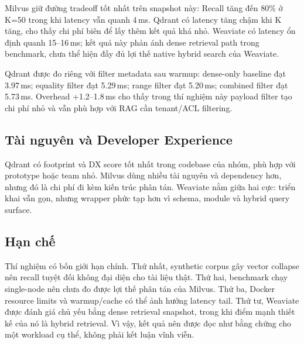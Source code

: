 Milvus giữ đường tradeoff tốt nhất trên snapshot này: Recall tăng đến 80\% ở K=50 trong khi latency vẫn quanh 4\,ms. Qdrant có latency tăng chậm khi K tăng, cho thấy chi phí biên để lấy thêm kết quả khá nhỏ. Weaviate có latency ổn định quanh 15--16\,ms; kết quả này phản ánh dense retrieval path trong benchmark, chưa thể hiện đầy đủ lợi thế native hybrid search của Weaviate.

Qdrant được đo riêng với filter metadata sau warmup: dense-only baseline đạt 3.97\,ms; equality filter đạt 5.29\,ms; range filter đạt 5.20\,ms; combined filter đạt 5.73\,ms. Overhead +1.2--1.8\,ms cho thấy trong thí nghiệm này payload filter tạo chi phí nhỏ và vẫn phù hợp với RAG cần tenant/ACL filtering.

\subsection{Tài nguyên và Developer Experience}

\begin{table}[H]
\centering
\caption{Tài nguyên và DX trong codebase benchmark của nhóm.}
\label{tab:dx-resource}
\end{table}

Qdrant có footprint và DX score tốt nhất trong codebase của nhóm, phù hợp với prototype hoặc team nhỏ. Milvus dùng nhiều tài nguyên và dependency hơn, nhưng đó là chi phí đi kèm kiến trúc phân tán. Weaviate nằm giữa hai cực: triển khai vẫn gọn, nhưng wrapper phức tạp hơn vì schema, module và hybrid query surface.

\subsection{Hạn chế}

Thí nghiệm có bốn giới hạn chính. Thứ nhất, synthetic corpus gây vector collapse nên recall tuyệt đối không đại diện cho tài liệu thật. Thứ hai, benchmark chạy single-node nên chưa đo được lợi thế phân tán của Milvus. Thứ ba, Docker resource limits và warmup/cache có thể ảnh hưởng latency tail. Thứ tư, Weaviate được đánh giá chủ yếu bằng dense retrieval snapshot, trong khi điểm mạnh thiết kế của nó là hybrid retrieval. Vì vậy, kết quả nên được đọc như bằng chứng cho một workload cụ thể, không phải kết luận vĩnh viễn.
